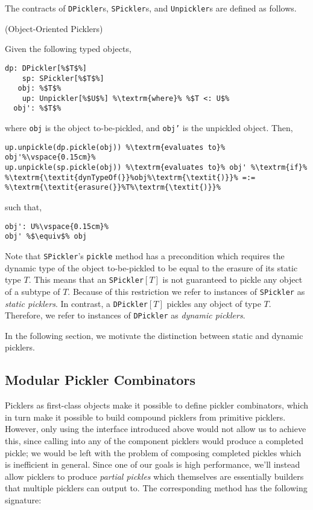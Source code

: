 \documentclass[preprint,10pt]{sigplanconf}
\theoremstyle{definition}
\newcommand{\term}[1]{\mbox{\texttt{#1}}}
\begin{document}
The contracts of \term{DPickler}s, \term{SPickler}s, and \term{Unpickler}s are
defined as follows.

\begin{defn}(Object-Oriented Picklers)

\noindent Given the following typed objects,

\begin{lstlisting}[escapechar=\%]
    dp: DPickler[%$T$%]
    sp: SPickler[%$T$%]
   obj: %$T$%
    up: Unpickler[%$U$%] %\textrm{where}% %$T <: U$%
  obj': %$T$%
\end{lstlisting}

\noindent where \term{obj} is the object to-be-pickled, and \term{obj'} is the unpickled
object. Then,

\begin{lstlisting}[escapechar=\%]
up.unpickle(dp.pickle(obj)) %\textrm{evaluates to}% obj'%\vspace{0.15cm}%
up.unpickle(sp.pickle(obj)) %\textrm{evaluates to}% obj' %\textrm{if}% %\textrm{\textit{dynTypeOf(}}%obj%\textrm{\textit{)}}% =:= %\textrm{\textit{erasure(}}%T%\textrm{\textit{)}}%
\end{lstlisting}

\noindent such that,

\begin{lstlisting}[escapechar=\%]
obj': U%\vspace{0.15cm}%
obj' %$\equiv$% obj
\end{lstlisting}
\end{defn}

Note that \term{SPickler}'s \term{pickle} method has a precondition which
requires the dynamic type of the object to-be-pickled to be equal to the
erasure of its static type $T$. This means that an \term{SPickler}$[T]$ is not
guaranteed to pickle any object of a subtype of $T$. Because of this
restriction we refer to instances of \term{SPickler} as {\em static picklers}.
In contrast, a \term{DPickler}$[T]$ pickles any object of type $T$. Therefore,
we refer to instances of \term{DPickler} as {\em dynamic picklers}.

In the following section, we motivate the distinction between static and
dynamic picklers.

\subsection{Modular Pickler Combinators}

Picklers as first-class objects make it possible to define pickler
combinators, which in turn make it possible to build compound picklers from
primitive picklers. However, only using the interface introduced above would
not allow us to achieve this, since calling into any of the component picklers
would produce a completed pickle; we would be left with the problem of
composing completed pickles which is inefficient in general. Since one of our
goals is high performance, we'll instead allow picklers to produce {\em
partial pickles} which themselves are essentially builders \cite{Gamma1995}
that multiple picklers can output to. The corresponding method has the
following signature:
\end{document}
